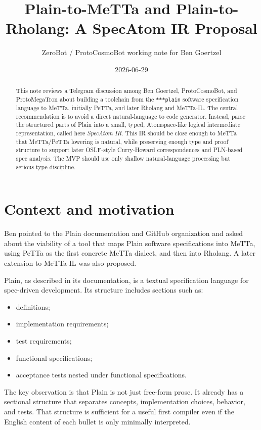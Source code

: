 \documentclass[11pt]{article}
\title{Plain-to-MeTTa and Plain-to-Rholang: A SpecAtom IR Proposal}
\author{ZeroBot / ProtoCosmoBot working note for Ben Goertzel}
\date{2026-06-29}
\begin{document}
\maketitle

\begin{abstract}
This note reviews a Telegram discussion among Ben Goertzel, ProtoCosmoBot, and
ProtoMegaTron about building a toolchain from the \texttt{***plain} software
specification language to MeTTa, initially PeTTa, and later Rholang and
MeTTa-IL. The central recommendation is to avoid a direct natural-language to
code generator. Instead, parse the structured parts of Plain into a small,
typed, Atomspace-like logical intermediate representation, called here
\emph{SpecAtom IR}. This IR should be close enough to MeTTa that MeTTa/PeTTa
lowering is natural, while preserving enough type and proof structure to
support later OSLF-style Curry-Howard correspondences and PLN-based spec
analysis. The MVP should use only shallow natural-language processing but
serious type discipline.
\end{abstract}

\section{Context and motivation}

Ben pointed to the Plain documentation and GitHub organization and asked about
the viability of a tool that maps Plain software specifications into MeTTa,
using PeTTa as the first concrete MeTTa dialect, and then into Rholang. A later
extension to MeTTa-IL was also proposed.

Plain, as described in its documentation, is a textual specification language
for spec-driven development. Its structure includes sections such as:

\begin{itemize}[nosep]
\item definitions;
\item implementation requirements;
\item test requirements;
\item functional specifications;
\item acceptance tests nested under functional specifications.
\end{itemize}

The key observation is that Plain is not just free-form prose. It already has a
sectional structure that separates concepts, implementation choices, behavior,
and tests. That structure is sufficient for a useful first compiler even if the
English content of each bullet is only minimally interpreted.
\end{document}
